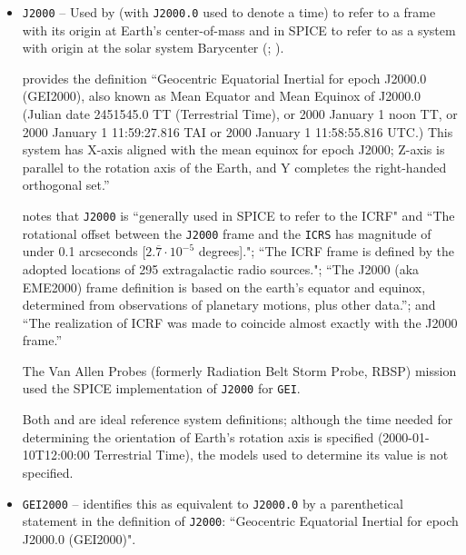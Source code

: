 \documentclass[draft]{agujournal2019}
\begin{document}
\begin{itemize}
    \parskip 0.1in 

    \item \texttt{J2000} -- Used by  (with \texttt{J2000.0} used to denote a time) to refer to a frame with its origin at Earth's center-of-mass and in SPICE to refer to as a system with origin at the solar system Barycenter (; ).
    
      provides the definition ``Geocentric Equatorial Inertial for epoch J2000.0 (GEI2000), also known as Mean Equator and Mean Equinox of J2000.0 (Julian date 2451545.0 TT (Terrestrial Time), or 2000 January 1 noon TT, or 2000 January 1 11:59:27.816 TAI or 2000 January 1 11:58:55.816 UTC.) This system has X-axis aligned with the mean equinox for epoch J2000; Z-axis is parallel to the rotation axis of the Earth, and Y completes the right-handed orthogonal set.''

     notes that \texttt{J2000} is ``generally used in SPICE to refer to the ICRF" and ``The rotational offset between the \texttt{J2000} frame and the \texttt{ICRS} has magnitude of under 0.1 arcseconds [$2.\overline{7}\cdot 10^{-5}$ degrees]."; ``The ICRF frame is defined by the adopted locations of 295 extragalactic radio sources."; ``The J2000 (aka EME2000) frame definition is based on the earth’s equator and equinox, determined from observations of planetary motions, plus other data.''; and ``The realization of ICRF was made to coincide almost exactly with the J2000 frame.'' 


    The Van Allen Probes (formerly Radiation Belt Storm Probe, RBSP) mission used the SPICE implementation of \texttt{J2000} for \texttt{GEI}. 
    
    Both  and  are ideal reference system definitions; although the time needed for determining the orientation of Earth's rotation axis is specified (2000-01-10T12:00:00 Terrestrial Time), the models used to determine its value is not specified.

    \item \texttt{GEI2000} --  identifies this as equivalent to \texttt{J2000.0} by a parenthetical statement in the definition of \texttt{J2000}: ``Geocentric Equatorial Inertial for epoch J2000.0 (GEI2000)".


\end{itemize}
\end{document}
